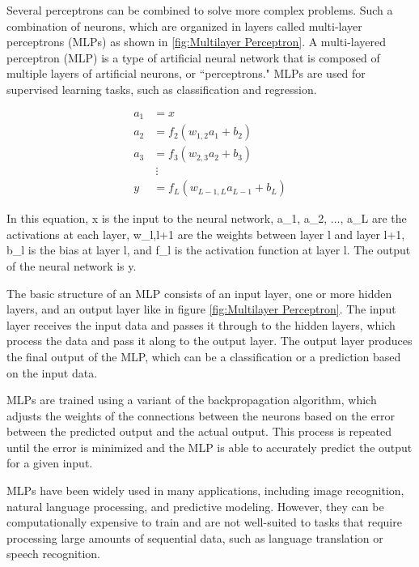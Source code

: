 \documentclass{book}
\begin{document}
	Several perceptrons can be combined to solve more complex problems. Such a
	combination of neurons, which are organized in layers called multi-layer perceptrons (MLPs) as shown in \ref{fig:Multilayer Perceptron}. A multi-layered perceptron (MLP) is a type of artificial neural network that is composed of multiple layers of artificial neurons, or ``perceptrons." MLPs are used for supervised learning tasks, such as classification and regression.
	
	\begin{align*}
	a_1 &= x \\
	a_2 &= f_2(w_{1,2} a_1 + b_2) \\
	a_3 &= f_3(w_{2,3} a_2 + b_3) \\
	& \ \vdots \\
	y &= f_L(w_{L-1,L} a_{L-1} + b_L)
	\end{align*}
	
	In this equation, x is the input to the neural network, a\_1, a\_2, ..., a\_L are the activations at each layer, w\_{l,l+1} are the weights between layer l and layer l+1, b\_l is the bias at layer l, and f\_l is the activation function at layer l. The output of the neural network is y.
	
	The basic structure of an MLP consists of an input layer, one or more hidden layers, and an output layer like in figure \ref{fig:Multilayer Perceptron}. The input layer receives the input data and passes it through to the hidden layers, which process the data and pass it along to the output layer. The output layer produces the final output of the MLP, which can be a classification or a prediction based on the input data.
	
	MLPs are trained using a variant of the backpropagation algorithm, which adjusts the weights of the connections between the neurons based on the error between the predicted output and the actual output. This process is repeated until the error is minimized and the MLP is able to accurately predict the output for a given input.
	
	MLPs have been widely used in many applications, including image recognition, natural language processing, and predictive modeling. However, they can be computationally expensive to train and are not well-suited to tasks that require processing large amounts of sequential data, such as language translation or speech recognition.
	
\end{document}
